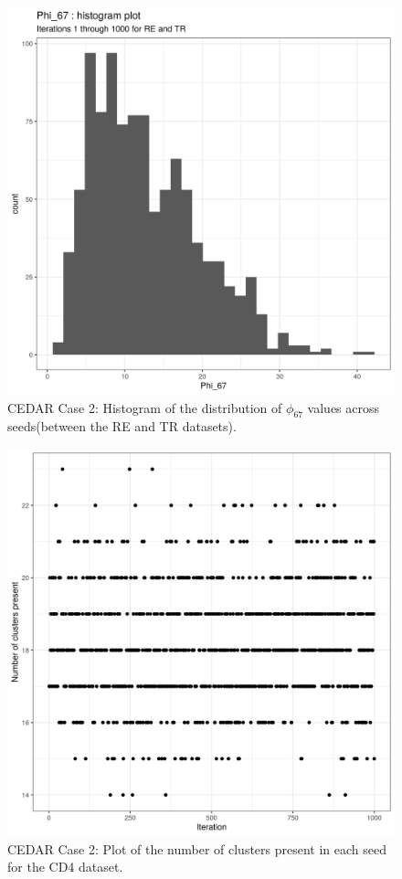 \documentclass[14pt]{extarticle} %
\begin{document}
	\begin{figure}[h]
		\centering
		\includegraphics[scale=0.75]{Images/Biology_data/Set_1000/All_datasets/Phi_histograms/Phi_67_histogram_plot.png}
		\caption{CEDAR Case 2: Histogram of the distribution of $\phi_{67}$ values across seeds(between the RE and TR datasets).}
		\label{fig:results:cedar_2:mdi_re_tr_phi_histogram}
	\end{figure}
	
	
	
	\begin{figure}[h]
		\centering
		\includegraphics[scale=0.75]{Images/Biology_data/Set_1000/All_datasets/Cluster_series_plots/CD4.png}
		\caption{CEDAR Case 2: Plot of the number of clusters present in each seed for the CD4 dataset.}
		\label{fig:results:cedar_2:mdi_cd4_number_clusters_plot}
	\end{figure}
	
\end{document}
